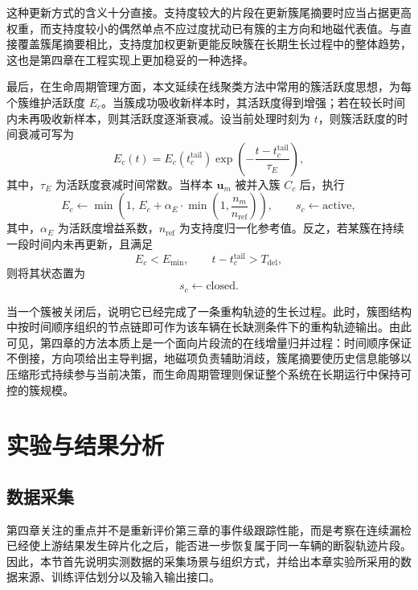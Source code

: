 \documentclass{xdupgthesis}
\begin{document}
这种更新方式的含义十分直接。支持度较大的片段在更新簇尾摘要时应当占据更高权重，而支持度较小的偶然单点不应过度扰动已有簇的主方向和地磁代表值。与直接覆盖簇尾摘要相比，支持度加权更新更能反映簇在长期生长过程中的整体趋势，这也是第四章在工程实现上更加稳妥的一种选择。

最后，在生命周期管理方面，本文延续在线聚类方法中常用的簇活跃度思想，为每个簇维护活跃度 $E_c$。当簇成功吸收新样本时，其活跃度得到增强；若在较长时间内未再吸收新样本，则其活跃度逐渐衰减。设当前处理时刻为 $t$，则簇活跃度的时间衰减可写为
\begin{equation}
	E_c(t)=E_c(t_c^{\mathrm{tail}})
	\exp
	\left(
	-\frac{t-t_c^{\mathrm{tail}}}{\tau_E}
	\right),
\end{equation}
其中，$\tau_E$ 为活跃度衰减时间常数。当样本 $\mathbf{u}_m$ 被并入簇 $C_c$ 后，执行
\begin{equation}
	E_c\leftarrow
	\min
	\left(
	1,\,
	E_c+\alpha_E\cdot \min\left(1,\frac{n_m}{n_{\mathrm{ref}}}\right)
	\right),
	\qquad
	s_c\leftarrow \mathrm{active},
\end{equation}
其中，$\alpha_E$ 为活跃度增益系数，$n_{\mathrm{ref}}$ 为支持度归一化参考值。反之，若某簇在持续一段时间内未再更新，且满足
\begin{equation}
	E_c<E_{\min},
	\qquad
	t-t_c^{\mathrm{tail}}>T_{\mathrm{del}},
\end{equation}
则将其状态置为
\begin{equation}
	s_c\leftarrow \mathrm{closed}.
\end{equation}

当一个簇被关闭后，说明它已经完成了一条重构轨迹的生长过程。此时，簇图结构中按时间顺序组织的节点链即可作为该车辆在长缺测条件下的重构轨迹输出。由此可见，第四章的方法本质上是一个面向片段流的在线增量归并过程：时间顺序保证不倒接，方向项给出主导判据，地磁项负责辅助消歧，簇尾摘要使历史信息能够以压缩形式持续参与当前决策，而生命周期管理则保证整个系统在长期运行中保持可控的簇规模。


\section{实验与结果分析}

\subsection{数据采集}

第四章关注的重点并不是重新评价第三章的事件级跟踪性能，而是考察在连续漏检已经使上游结果发生碎片化之后，能否进一步恢复属于同一车辆的断裂轨迹片段。因此，本节首先说明实测数据的采集场景与组织方式，并给出本章实验所采用的数据来源、训练评估划分以及输入输出接口。
\end{document}
